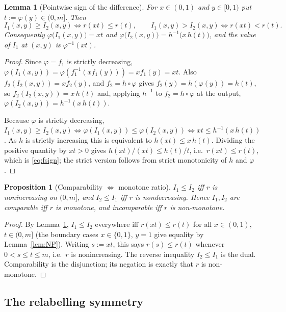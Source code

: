 \documentclass{amsart}
\theoremstyle{plain}
\newtheorem{lemma}{Lemma}
\newtheorem{proposition}{Proposition}
\theoremstyle{definition}
\begin{document}
\begin{lemma}[Pointwise sign of the difference]\label{lem:fsign}
For $x\in(0,1)$ and $y\in[0,1)$ put $t:=\varphi(y)\in(0,m]$.  Then
\begin{equation}\label{eq:fsign}
I_1(x,y)\ge I_2(x,y)\iff r(xt)\le r(t),\qquad
I_1(x,y)> I_2(x,y)\iff r(xt)< r(t).
\end{equation}
Consequently $\varphi\bigl(I_1(x,y)\bigr)=xt$ and
$\varphi\bigl(I_2(x,y)\bigr)=h^{-1}\!\bigl(x\,h(t)\bigr)$, and the value of $I_1$ at
$(x,y)$ is $\varphi^{-1}(xt)$.
\end{lemma}

\begin{proof}
Since $\varphi=f_1$ is strictly decreasing, $\varphi(I_1(x,y))=\varphi(f_1^{-1}(x f_1(y)))
=x f_1(y)=x t$.  Also $f_2(I_2(x,y))=x f_2(y)$, and $f_2=h\circ\varphi$ gives
$f_2(y)=h(\varphi(y))=h(t)$, so $f_2(I_2(x,y))=x\,h(t)$ and, applying $h^{-1}$ to
$f_2=h\circ\varphi$ at the output, $\varphi(I_2(x,y))=h^{-1}(x\,h(t))$.

Because $\varphi$ is strictly decreasing, $I_1(x,y)\ge I_2(x,y)\iff
\varphi(I_1(x,y))\le\varphi(I_2(x,y))\iff xt\le h^{-1}(x\,h(t))$.  As $h$ is strictly
increasing this is equivalent to $h(xt)\le x\,h(t)$.  Dividing the positive quantity by
$xt>0$ gives $h(xt)/(xt)\le h(t)/t$, i.e.\ $r(xt)\le r(t)$, which is \eqref{eq:fsign}; the
strict version follows from strict monotonicity of $h$ and $\varphi$.
\end{proof}

\begin{proposition}[Comparability $\iff$ monotone ratio]\label{prop:f}
$I_1\le I_2$ iff $r$ is nonincreasing on $(0,m]$, and $I_2\le I_1$ iff $r$ is nondecreasing.
Hence $I_1,I_2$ are comparable iff $r$ is monotone, and \emph{incomparable iff $r$ is
non-monotone}.
\end{proposition}

\begin{proof}
By Lemma~\ref{lem:fsign}, $I_1\le I_2$ everywhere iff $r(xt)\le r(t)$ for all $x\in(0,1)$,
$t\in(0,m]$ (the boundary cases $x\in\{0,1\}$, $y=1$ give equality by
Lemma~\ref{lem:NP}).  Writing $s:=xt$, this says $r(s)\le r(t)$ whenever $0<s\le t\le m$,
i.e.\ $r$ is nonincreasing.  The reverse inequality $I_2\le I_1$ is the dual.  Comparability
is the disjunction; its negation is exactly that $r$ is non-monotone.
\end{proof}

\subsection{The relabelling symmetry}
\end{document}
